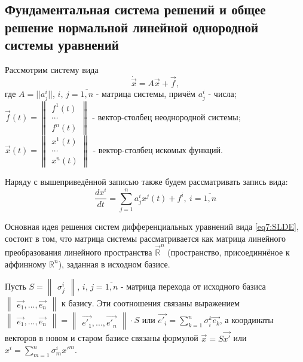 



\subsection{Фундаментальная система решений и общее решение нормальной линейной однородной
системы уравнений}

Рассмотрим систему вида 
\begin{equation}
    \label{eq7:SLDE}
    \dot{\vec{x}} = A \vec{x} + \vec{f},
\end{equation} 
где $A = || a^i_j||$, $i,\,j = \overline{1, n}$ - матрица системы, 
причём $a^i_j$ - числа; 
$ \vec{f}(t) = 
  \begin{Vmatrix}
    f^1(t) \\
    \cdots    \\
    f^n(t)
  \end{Vmatrix}$ - вектор-столбец неоднородной системы;
$\vec{x}(t) = 
\begin{Vmatrix}
  x^1(t) \\
  \cdots    \\
  x^n(t)
\end{Vmatrix}$ - вектор-столбец искомых функций.  


Наряду с вышеприведённой записью также будем рассматривать запись вида: 
$$\frac{dx^i}{dt} = \sum\limits^n_{j=1}a^i_j x^j(t) + f^i, ~i = \overline{1, n}$$

Основная идея решения систем дифференциальных уравнений вида \eqref{eq7:SLDE}, 
состоит в том, что матрица системы рассматривается как матрица линейного преобразования 
линейного пространства $\vec{\mathbb{R}}^n$ (пространство, присоединнёное к аффинному 
$\mathbb{R}^n$), заданная в исходном базисе. 

Пусть $S = \begin{Vmatrix} \sigma_j^i \end{Vmatrix}$, $i,\,j = \overline{1, n}$ - матрица перехода от исходного базиса $\begin{Vmatrix} \vec{e_1}, ..., \vec{e_n} \end{Vmatrix}$ к базису. 
Эти соотношения связаны выражением $\begin{Vmatrix} \vec{e_1}, ..., \vec{e_n} \end{Vmatrix} = \begin{Vmatrix} \vec{e'_1}, ..., \vec{e'_n} \end{Vmatrix} \cdot S $ 
или $\vec{e'_i} = \sum\limits_{k = 1}^n \sigma_i^k \vec{e_k}$, а координаты векторов в новом и старом базисе связаны формулой $\vec{x} = S \vec{x'}$ или $x^i = \sum\limits_{m = 1}^n \sigma_m^i {x'}^m$.

